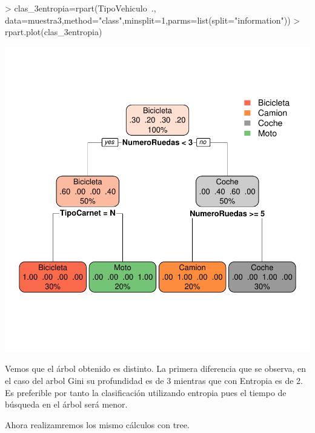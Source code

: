 \documentclass [a4paper] {article}
\begin{document}
\begin{center}
\begin{Schunk}
\begin{Sinput}
> clas_3entropia=rpart(TipoVehiculo~., data=muestra3,method="class",minsplit=1,parms=list(split="information"))
> rpart.plot(clas_3entropia)
\end{Sinput}
\end{Schunk}
\includegraphics{entrega2-rpart3_entropia}
\end{center}

Vemos que el árbol obtenido es distinto.
La primera diferencia que se observa, en el caso del arbol Gini su profundidad es de 3 mientras que con Entropia es de 2. 
Es preferible por tanto la clasificación utilizando entropia pues el tiempo de búsqueda en el árbol será menor.

Ahora realizamremos los mismo cálculos con tree.
\end{document}
